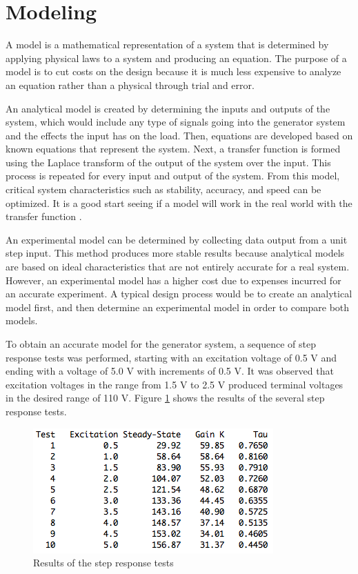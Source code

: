 \section{Modeling}
A model is a mathematical representation of a system that is determined by applying physical laws to a system and producing an equation.  The purpose of a model is to cut costs on the design because it is much less expensive to analyze an equation rather than a physical through trial and error.

An analytical model is created by determining the inputs and outputs of the system, which would include any type of signals going into the generator system and the effects the input has on the load.  Then, equations are developed based on known equations that represent the system.  Next, a transfer function is formed using the Laplace transform of the output of the system over the input.  This process is repeated for every input and output of the system.  From this model, critical system characteristics such as stability, accuracy, and speed can be optimized.  It is a good start seeing if a model will work in the real world with the transfer function \cite{analysis}.

An experimental model can be determined by collecting data output from a unit step input. This method produces more stable results because analytical models are based on ideal characteristics that are not entirely accurate for a real system. However, an experimental model has a higher cost due to expenses incurred for an accurate experiment. A typical design process would be to create an analytical model first, and then determine an experimental model in order to compare both models.

To obtain an accurate model for the generator system, a sequence of step response tests was performed, starting with an excitation voltage of 0.5 V and ending with a voltage of  5.0 V with increments of 0.5 V. It was observed that excitation voltages in the range from 1.5 V to 2.5 V produced terminal voltages in the desired range of 110 V. Figure \ref{fig:test_data} shows the results of the several step response tests.

\begin{figure}[h!]
\begin{center}
\includegraphics[scale=0.9]{./img/test_results.png}
\end{center}
\caption{Results of the step response tests}
\label{fig:test_data}
\end{figure}

